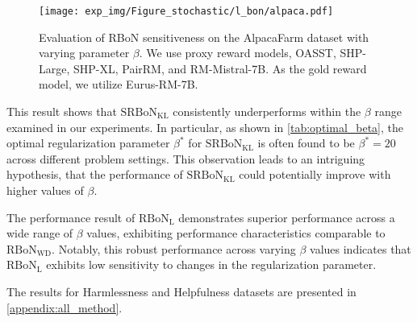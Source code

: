 \begin{figure}[h]
    \centering
    \texttt{[image: exp\_img/Figure\_stochastic/l\_bon/alpaca.pdf]}
    \caption{
   Evaluation of RBoN sensitiveness on the AlpacaFarm dataset with varying parameter $\beta$. We use proxy reward models, OASST, SHP-Large, SHP-XL, PairRM, and RM-Mistral-7B. As the gold reward model, we utilize Eurus-RM-7B.
    }
    \label{fig:alpaca-l}
\end{figure}
This result shows that $\mathrm{SRBoN}_{\mathrm{KL}}$ consistently underperforms within the $\beta$ range examined in our experiments. In particular, as shown in \cref{tab:optimal_beta}, the optimal regularization parameter $\beta^*$ for $\mathrm{SRBoN}_{\mathrm{KL}}$ is often found to be $\beta^*=20$ across different problem settings. This observation leads to an intriguing hypothesis, that the performance of $\mathrm{SRBoN}_{\mathrm{KL}}$ could potentially improve with higher values of $\beta$. 


The performance result of $\mathrm{RBoN}_{\mathrm{L}}$ demonstrates superior performance across a wide range of $\beta$ values, exhibiting performance characteristics comparable to $\mathrm{RBoN}_{\mathrm{WD}}$. Notably, this robust performance across varying $\beta$ values indicates that $\mathrm{RBoN}_{\mathrm{L}}$ exhibits low sensitivity to changes in the regularization parameter.

The results for Harmlessness and Helpfulness datasets are presented in \cref{appendix:all_method}.


